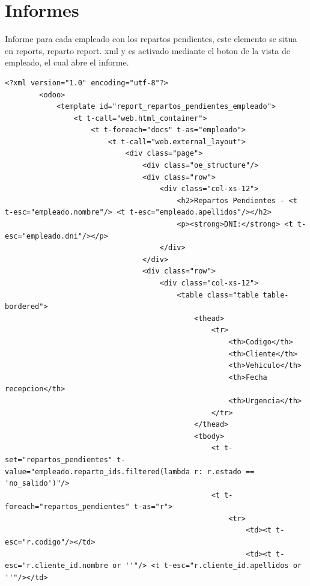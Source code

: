 \documentclass[a4paper, 11pt]{article}
\begin{document}
\section{Informes}
    Informe para cada empleado con los repartos pendientes, este elemento se situa en reports, reparto report. xml y es activado
     mediante el boton de la vista de empleado, el cual abre el informe. \\
    \begin{lstlisting}[frame=single,breaklines=true]
        <?xml version="1.0" encoding="utf-8"?>
        <odoo>
            <template id="report_repartos_pendientes_empleado">
                <t t-call="web.html_container">
                    <t t-foreach="docs" t-as="empleado">
                        <t t-call="web.external_layout">
                            <div class="page">
                                <div class="oe_structure"/>
                                <div class="row">
                                    <div class="col-xs-12">
                                        <h2>Repartos Pendientes - <t t-esc="empleado.nombre"/> <t t-esc="empleado.apellidos"/></h2>
                                        <p><strong>DNI:</strong> <t t-esc="empleado.dni"/></p>
                                    </div>
                                </div>
                                <div class="row">
                                    <div class="col-xs-12">
                                        <table class="table table-bordered">
                                            <thead>
                                                <tr>
                                                    <th>Codigo</th>
                                                    <th>Cliente</th>
                                                    <th>Vehiculo</th>
                                                    <th>Fecha recepcion</th>
                                                    <th>Urgencia</th>
                                                </tr>
                                            </thead>
                                            <tbody>
                                                <t t-set="repartos_pendientes" t-value="empleado.reparto_ids.filtered(lambda r: r.estado == 'no_salido')"/>
                                                <t t-foreach="repartos_pendientes" t-as="r">
                                                    <tr>
                                                        <td><t t-esc="r.codigo"/></td>
                                                        <td><t t-esc="r.cliente_id.nombre or ''"/> <t t-esc="r.cliente_id.apellidos or ''"/></td>

\end{lstlisting}
\end{document}
